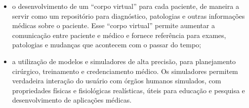 \begin{itemize}
\begin{itemize}
			\item o desenvolvimento de um “corpo virtual”
				para cada paciente, de maneira a servir
				como um repositório para diagnóstico,
				patologias e outras informações médicas
				sobre o paciente.  Esse “corpo virtual”
				permite aumentar a comunicação entre
				paciente e médico e fornece referência
				para exames, patologias e mudanças que
				acontecem com o passar do tempo;

			\item a utilização de modelos e simuladores de
				alta precisão, para planejamento
				cirúrgico, treinamento e credenciamento
				médico. Os simuladores permitem
				verdadeira interação do usuário com
				órgãos humanos simulados, com
				propriedades físicas e fisiológicas
				realísticas, úteis para educação e
				pesquisa e desenvolvimento de aplicações
				médicas.
		\end{itemize}

\end{itemize}
